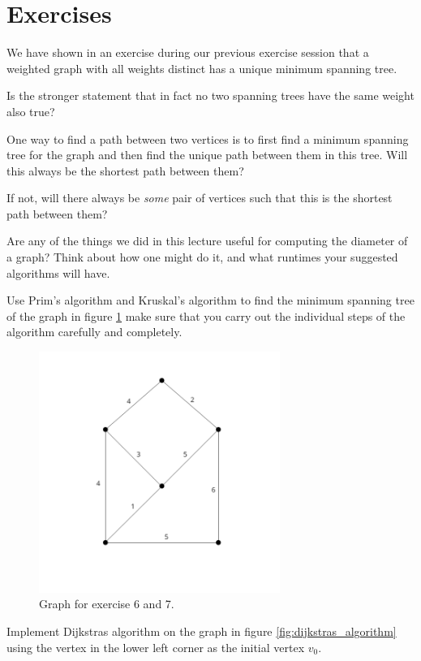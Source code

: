 \documentclass[nobib]{tufte-handout}
\begin{document}
\section{Exercises}

\begin{xca}
  We have shown in an exercise during our previous exercise session that a weighted graph with all weights distinct has a unique minimum spanning tree.

  Is the stronger statement that in fact no two spanning trees have the same weight also true?
\end{xca}

\begin{xca}
  One way to find a path between two vertices is to first find a minimum spanning tree for the graph and then find the unique path between them in this tree. Will this always be the shortest path between them?

  If not, will there always be \emph{some} pair of vertices such that this is the shortest path between them?
\end{xca}

\begin{xca}
  Are any of the things we did in this lecture useful for computing the diameter of a graph? Think about how one might do it, and what runtimes your suggested algorithms will have.
\end{xca}

\begin{xca}
Use Prim's algorithm and Kruskal's algorithm to find the minimum spanning tree of the graph in figure \ref{fig:new_exercise} make sure that you carry out the individual steps of the algorithm carefully and completely. 
\begin{figure}
    \centering
    \includegraphics[width=0.7\textwidth]{graphics/L6_prim_kruskal_dijkstra/graph_exc6-7.png}
    \caption{Graph for exercise 6 and 7.}
    \label{fig:new_exercise}
\end{figure}
\end{xca}

\begin{xca}
Implement Dijkstras algorithm on the graph in figure \ref{fig:dijkstras_algorithm} using the vertex in the lower left corner as the initial vertex $v_0$.
\end{xca}

%
%
\end{document}
